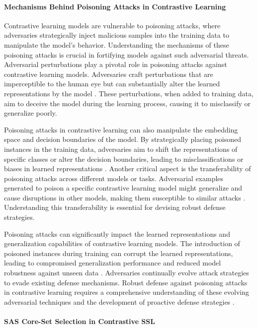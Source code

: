 \paragraph{Mechanisms Behind Poisoning Attacks in Contrastive Learning}

Contrastive learning models are vulnerable to poisoning attacks, where adversaries strategically inject malicious samples into the training data to manipulate the model's behavior. Understanding the mechanisms of these poisoning attacks is crucial in fortifying models against such adversarial threats. Adversarial perturbations play a pivotal role in poisoning attacks against contrastive learning models. Adversaries craft perturbations that are imperceptible to the human eye but can substantially alter the learned representations by the model \cite{goodfellow2014explaining}. These perturbations, when added to training data, aim to deceive the model during the learning process, causing it to misclassify or generalize poorly.

Poisoning attacks in contrastive learning can also manipulate the embedding space and decision boundaries of the model. By strategically placing poisoned instances in the training data, adversaries aim to shift the representations of specific classes or alter the decision boundaries, leading to misclassifications or biases in learned representations \cite{kim2020adversarial}. Another critical aspect is the transferability of poisoning attacks across different models or tasks. Adversarial examples generated to poison a specific contrastive learning model might generalize and cause disruptions in other models, making them susceptible to similar attacks \cite{papernot2016transferability}. Understanding this transferability is essential for devising robust defense strategies.

Poisoning attacks can significantly impact the learned representations and generalization capabilities of contrastive learning models. The introduction of poisoned instances during training can corrupt the learned representations, leading to compromised generalization performance and reduced model robustness against unseen data \cite{munoz2017towards}. Adversaries continually evolve attack strategies to evade existing defense mechanisms. Robust defense against poisoning attacks in contrastive learning requires a comprehensive understanding of these evolving adversarial techniques and the development of proactive defense strategies \cite{biggio2013evasion}.


\paragraph{SAS Core-Set Selection in Contrastive SSL}

